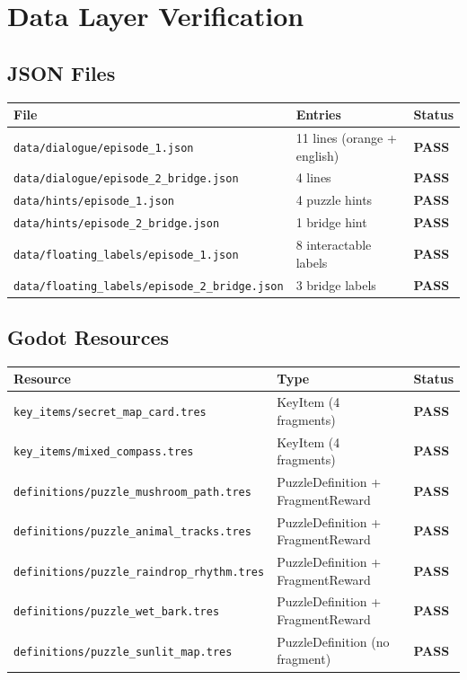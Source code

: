 \documentclass[12pt, a4paper]{article}
\newcommand{\statuspass}{\textcolor{passgre}{\textbf{PASS}}}
\begin{document}
\section{Data Layer Verification}

\subsection{JSON Files}

\begin{center}
\begin{tabular}{lll}
\toprule
\textbf{File} & \textbf{Entries} & \textbf{Status} \\
\midrule
\texttt{data/dialogue/episode\_1.json}       & 11 lines (orange + english) & \statuspass \\
\texttt{data/dialogue/episode\_2\_bridge.json} & 4 lines                   & \statuspass \\
\texttt{data/hints/episode\_1.json}          & 4 puzzle hints              & \statuspass \\
\texttt{data/hints/episode\_2\_bridge.json}  & 1 bridge hint               & \statuspass \\
\texttt{data/floating\_labels/episode\_1.json}      & 8 interactable labels & \statuspass \\
\texttt{data/floating\_labels/episode\_2\_bridge.json} & 3 bridge labels  & \statuspass \\
\bottomrule
\end{tabular}
\end{center}

\subsection{Godot Resources}

\begin{center}
\begin{tabular}{lll}
\toprule
\textbf{Resource} & \textbf{Type} & \textbf{Status} \\
\midrule
\texttt{key\_items/secret\_map\_card.tres}  & KeyItem (4 fragments)     & \statuspass \\
\texttt{key\_items/mixed\_compass.tres}     & KeyItem (4 fragments)     & \statuspass \\
\texttt{definitions/puzzle\_mushroom\_path.tres}  & PuzzleDefinition + FragmentReward & \statuspass \\
\texttt{definitions/puzzle\_animal\_tracks.tres}  & PuzzleDefinition + FragmentReward & \statuspass \\
\texttt{definitions/puzzle\_raindrop\_rhythm.tres} & PuzzleDefinition + FragmentReward & \statuspass \\
\texttt{definitions/puzzle\_wet\_bark.tres}       & PuzzleDefinition + FragmentReward & \statuspass \\
\texttt{definitions/puzzle\_sunlit\_map.tres}     & PuzzleDefinition (no fragment)    & \statuspass \\
\bottomrule
\end{tabular}
\end{center}
\end{document}
